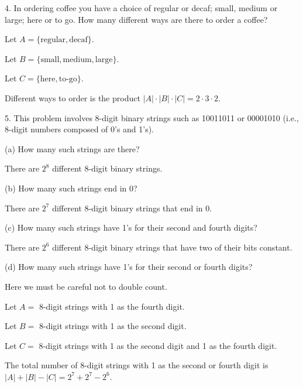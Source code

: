 \documentclass{idrisMemo}
\begin{document}
\begin{prooflist}{ 4. In ordering coffee you have a choice of regular or decaf; small, medium or large; here or to go. How many different ways are there to order a coffee? }
\item Let $A = \{\text{regular}, \text{decaf}\}$.
\item Let $B = \{\text{small}, \text{medium}, \text{large}\}$.
\item Let $C = \{\text{here}, \text{to-go}\}$.
\item Different ways to order is the product $|A|\cdot|B|\cdot|C| = 2 \cdot 3
    \cdot 2$.
\end{prooflist}

\begin{prooflist}{
5. This problem involves 8-digit binary strings such as 10011011 or 00001010
(i.e., 8-digit numbers composed of 0’s and 1’s).}
    \item (a) How many such strings are there?
    \item There are $2^8$ different 8-digit binary strings.
    \item (b) How many such strings end in 0?
    \item There are $2^7$ different 8-digit binary strings that end in $0$.
    \item (c) How many such strings have 1’s for their second and fourth digits?
    \item There are $2^6$ different 8-digit binary strings that have two of
        their bits constant.
    \item (d) How many such strings have 1’s for their second or fourth digits?
    \item Here we must be careful not to double count.
    \item Let $A =$ 8-digit strings with 1 as the fourth digit.
    \item Let $B =$ 8-digit strings with 1 as the second digit.
    \item Let $C =$ 8-digit strings with 1 as the second digit and 1 as the
        fourth digit.
    \item The total number of 8-digit strings with 1 as the second or fourth
    digit is $|A| + |B| - |C| = 2^7+2^7-2^6$.
\end{prooflist}
\end{document}
